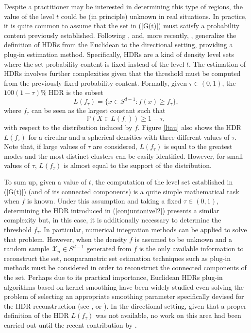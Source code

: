 Despite a practitioner may be interested in determining this type of regions, the value of the level $t$ could be (in principle) unknown in real situations. In practice, it is quite common to assume that the set in (\ref{G(t)}) must satisfy a probability content previously established. Following \cite{box1973bayesian},  \cite{hyndman1996computing} and, more recently, \cite{azzalini2007clustering}, \cite{saavedra2020nonparametric} generalize the definition of HDRs from the Euclidean to the directional setting, providing a plug-in estimation method. Specifically, HDRs are a kind of density level sets where the set probability content is fixed instead of the level $t$. The estimation of HDRs involves further complexities given that the threshold must be computed from the previously fixed probability content. Formally, given $\tau\in(0,1)$, the $100(1 - \tau)$\% HDR is the subset
\begin{equation}\label{conjuntonivel2}
L(f_\tau)=\{x\in S^{d-1}:f(x)\geq f_\tau\},
\end{equation}where $f_\tau$ can be seen as the largest constant such that 
$$
\mathbb{P}(X\in L(f_\tau))\geq 1-\tau,
$$with respect to the distribution induced by $f$. Figure \ref{ltau} also shows the HDR $L(f_\tau)$ for a circular and a spherical densities with three different values of $\tau$. Note that, if large values of $\tau$ are considered, $L(f_\tau)$ is equal to the greatest modes and the most distinct clusters can be easily identified. However, for small values of $\tau$, $L(f_\tau)$ is almost equal to the support of the distribution. 

To sum up, given a value of $t$, the computation of the level set established in (\ref{G(t)}) (and of its connected components) is a quite simple mathematical task when $f$ is known. Under this assumption and taking a fixed $\tau\in (0,1)$, determining the HDR introduced in (\ref{conjuntonivel2}) presents a similar complexity but, in this case, it is additionally necessary to determine the threshold $f_\tau$. In particular, numerical integration methods can be applied to solve that problem. However, when the density $f$ is assumed to be unknown and a random sample $\mathcal{X}_n\in S^{d-1}$ generated from $f$ is the only available information to reconstruct the set, nonparametric set estimation techniques such as plug-in methods must be considered in order to reconstruct the connected components of the set. Perhaps due to its practical importance, Euclidean HDRs plug-in algorithms based on kernel smoothing have been widely studied even solving the problem of selecting an appropriate smoothing parameter specifically devised for the HDR reconstruction (see \citealp{baillo2006parametric}, \citealp{samworth2010asymptotics} or \citealp{casa2020modal}). In the directional setting, given that a proper definition of the HDR $L(f_\tau)$ was not available, no work on this area had been carried out until the recent contribution by \cite{saavedra2020nonparametric}. 



